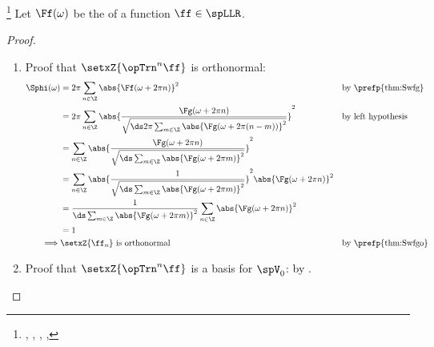 \begin{theorem}
\footnote{
  ,
  ,
  ,
  ,
  }
\label{thm:blo}
Let $\Ff(\omega)$ be the  of a function $\ff\in\spLLR$.
\end{theorem}
\begin{proof}
\begin{enumerate}
\item Proof that $\setxZ{\opTrn^n\ff}$ is orthonormal:
\begin{align*}
  \Sphi(\omega)
    &= 2\pi\sum_{n\in\Z} \abs{\Ff(\omega+2\pi n)}^2
    && \text{by \prefp{thm:Swfg}}
  \\&= 2\pi\sum_{n\in\Z} \abs{\frac{\Fg(\omega+2\pi n)}{\sqrt{\ds2\pi\sum_{m\in\Z}\abs{\Fg(\omega+2\pi(n-m))}^2}}}^2
    && \text{by left hypothesis}
  \\&= \sum_{n\in\Z} \abs{\frac{\Fg(\omega+2\pi n)}{\sqrt{\ds\sum_{m\in\Z}\abs{\Fg(\omega+2\pi m)}^2}}}^2
  \\&= \sum_{n\in\Z} \abs{ \frac{1}{\sqrt{\ds\sum_{m\in\Z}\abs{\Fg(\omega+2\pi m)}^2}} }^2
               \abs{\Fg(\omega+2\pi n)}^2
  \\&= \frac{1}{\ds\sum_{m\in\Z}\abs{\Fg(\omega+2\pi m)}^2}
        \sum_{n\in\Z} \abs{\Fg(\omega+2\pi n)}^2
  \\&= 1
  \\ \implies & \text{$\setxZ{\ff_n}$ is orthonormal}
    && \text{by \prefp{thm:Swfgo}}
\end{align*}


\item Proof that $\setxZ{\opTrn^n\ff}$ is a basis for $\spV_0$: by .

\end{enumerate}
\end{proof}

